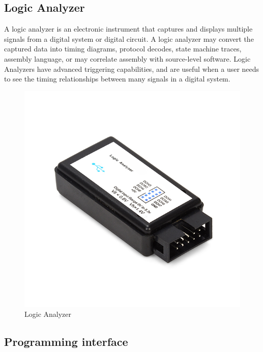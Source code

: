 \subsection{Logic Analyzer}
A logic analyzer is an electronic instrument that captures and displays multiple signals from a digital system or digital circuit. A logic analyzer may convert the captured data into timing diagrams, protocol decodes, state machine traces, assembly language, or may correlate assembly with source-level software. Logic Analyzers have advanced triggering capabilities, and are useful when a user needs to see the timing relationships between many signals in a digital system.\\
\begin{figure}[ht]
	\centering
	\includegraphics[scale=0.5]{images/logic_analyzer.png}
	\caption{Logic Analyzer}
\end{figure}
\subsection{Programming interface}
